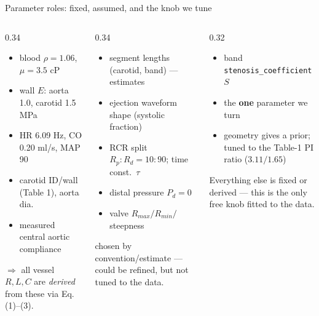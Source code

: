 \documentclass[aspectratio=169]{beamer}
\begin{document}
\begin{frame}{Parameter roles: fixed, assumed, and the knob we tune}
\scriptsize
\begin{columns}[T]
\begin{column}{0.34\textwidth}
\begin{itemize}\itemsep3pt
  \item blood $\rho=1.06$, $\mu=3.5$ cP
  \item wall $E$: aorta 1.0, carotid 1.5 MPa
  \item HR 6.09 Hz, CO 0.20 ml/s, MAP 90
  \item carotid ID/wall (Table 1), aorta dia.
  \item measured central aortic compliance
\end{itemize}
\vspace{0.3em}
{\tiny $\Rightarrow$ all vessel $R,L,C$ are \emph{derived} from these via Eq.\,(1)--(3).}
\end{column}
\begin{column}{0.34\textwidth}
\begin{itemize}\itemsep3pt
  \item segment lengths (carotid, band) --- estimates
  \item ejection waveform shape (systolic fraction)
  \item RCR split $R_p{:}R_d=10{:}90$; time const.\ $\tau$
  \item distal pressure $P_d=0$
  \item valve $R_{max}/R_{min}/$steepness
\end{itemize}
\vspace{0.3em}
{\tiny chosen by convention/estimate --- could be refined, but not tuned to the data.}
\end{column}
\begin{column}{0.32\textwidth}
\begin{itemize}\itemsep3pt
  \item band \texttt{stenosis\_coefficient} $S$
  \item the \textbf{one} parameter we turn
  \item geometry gives a prior; tuned to the Table-1 PI ratio ($3.11/1.65$)
\end{itemize}
\vspace{0.8em}
{\tiny Everything else is fixed or derived --- this is the only free knob fitted
to the data.}
\end{column}
\end{columns}
\end{frame}
\end{document}
